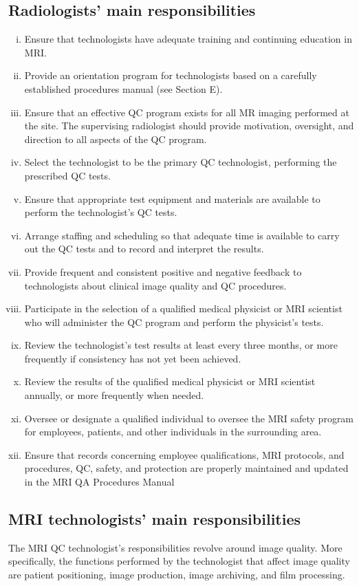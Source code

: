 \documentclass[12pt]{article}
\begin{document}
\subsection{Radiologists' main responsibilities}
\begin{enumerate}[i.]
    \item Ensure that technologists have adequate training and continuing
education in MRI.
    \item Provide an orientation program for technologists based on a
carefully established procedures manual (see Section E).
    \item Ensure that an effective QC program exists for all MR imaging
performed at the site. The supervising radiologist should
provide motivation, oversight, and direction to all aspects of
the QC program.
    \item Select the technologist to be the primary QC technologist,
performing the prescribed QC tests.
    \item Ensure that appropriate test equipment and materials are available
to perform the technologist’s QC tests.
    \item Arrange staffing and scheduling so that adequate time is available
to carry out the QC tests and to record and interpret the results.
    \item Provide frequent and consistent positive and negative feedback
to technologists about clinical image quality and QC procedures.
    \item Participate in the selection of a qualified medical physicist or
MRI scientist who will administer the QC program and perform
the physicist’s tests.
    \item Review the technologist’s test results at least every three months,
or more frequently if consistency has not yet been achieved.
    \item Review the results of the qualified medical physicist or MRI
scientist annually, or more frequently when needed.
    \item Oversee or designate a qualified individual to oversee the MRI
safety program for employees, patients, and other individuals in
the surrounding area.
    \item Ensure that records concerning employee qualifications, MRI
protocols, and procedures, QC, safety, and protection are
properly maintained and updated in the MRI QA Procedures
Manual
\end{enumerate}

\pagebreak 
\subsection{MRI technologists' main responsibilities}
The MRI QC technologist’s responsibilities revolve around image quality. More specifically, the functions performed by the technologist that affect image quality are patient positioning, image production, image archiving, and film processing.
\end{document}
